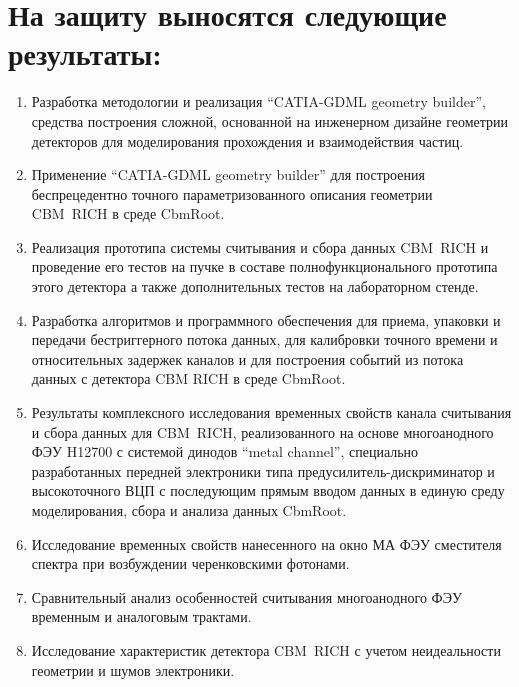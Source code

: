 \section*{На защиту выносятся следующие результаты:}

\begin{enumerate}
\item Разработка методологии и реализация ``CATIA-GDML geometry builder'', средства построения сложной, основанной на инженерном дизайне геометрии детекторов для моделирования прохождения и взаимодействия частиц.
\item Применение ``CATIA-GDML geometry builder'' для построения беспрецедентно точного параметризованного описания геометрии CBM~RICH в среде CbmRoot.
\item Реализация прототипа системы считывания и сбора данных CBM~RICH и проведение его тестов на пучке в составе полнофункционального прототипа этого детектора а также дополнительных тестов на лабораторном стенде.
\item Разработка алгоритмов и программного обеспечения для приема, упаковки и передачи бестриггерного потока данных, для калибровки точного времени и относительных задержек каналов и для построения событий из потока данных с детектора CBM RICH в среде CbmRoot.
\item Результаты комплексного исследования временных свойств канала считывания и сбора данных для CBM~RICH, реализованного на основе многоанодного ФЭУ H12700 с системой динодов ``metal channel'', специально разработанных передней электроники типа предусилитель-дискриминатор и высокоточного ВЦП с последующим прямым вводом данных в единую среду моделирования, сбора и анализа данных CbmRoot.
\item Исследование временных свойств нанесенного на окно МА ФЭУ сместителя спектра при возбуждении черенковскими фотонами.
\item Сравнительный анализ особенностей считывания многоанодного ФЭУ временным и аналоговым трактами.
\item Исследование характеристик детектора CBM~RICH с учетом неидеальности геометрии и шумов электроники.
\end{enumerate}

